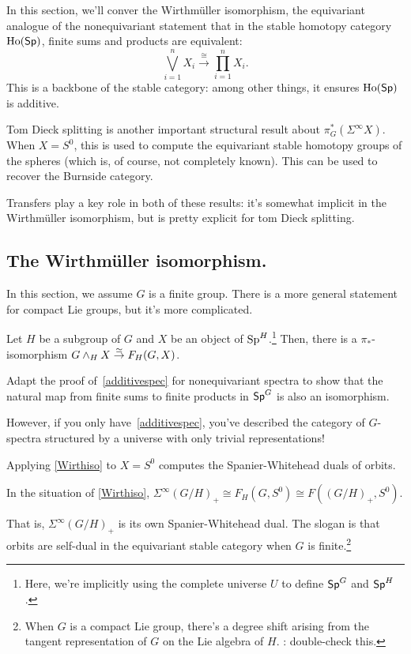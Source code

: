 In this section, we'll conver the Wirthmüller isomorphism, the equivariant analogue of the nonequivariant statement
that in the stable homotopy category $\operatorname{Ho}(\mathsf{Sp})$, finite sums and products are equivalent:
\begin{equation}
\label{additivespec}
\bigvee_{i=1}^n X_i\stackrel\cong\longrightarrow \prod_{i=1}^n X_i.
\end{equation}
This is a backbone of the stable category: among other things, it ensures $\operatorname{Ho}(\mathsf{Sp})$ is additive.

Tom Dieck splitting is another important structural result about $\pi_G^*(\Sigma^\infty X)$. When $X = S^0$, this
is used to compute the equivariant stable homotopy groups of the spheres (which is, of course, not completely
known). This can be used to recover the Burnside category.

Transfers play a key role in both of these results: it's somewhat implicit in the Wirthmüller isomorphism, but is
pretty explicit for tom Dieck splitting.
\subsection*{The Wirthmüller isomorphism.}
In this section, we assume $G$ is a finite group. There is a more general statement for compact Lie groups, but
it's more complicated.
\begin{thm}
\label{Wirthiso}
Let $H$ be a subgroup of $G$ and $X$ be an object of $\mathrm{Sp}^H$.\footnote{Here, we're implicitly using the complete
universe $U$ to define $\mathsf{Sp}^G$ and $\mathsf{Sp}^H$.} Then, there is a $\pi_*$-isomorphism $G\wedge_H X\stackrel\simeq\to F_H(G,X)$.
\end{thm}
\begin{ex}
Adapt the proof of~\eqref{additivespec} for nonequivariant spectra to show that the natural map from finite sums to
finite products in $\mathsf{Sp}^G$ is also an isomorphism.
\end{ex}
However, if you only have~\eqref{additivespec}, you've described the category of $G$-spectra structured by a
universe with only trivial representations!

Applying \cref{Wirthiso} to $X = S^0$ computes the Spanier-Whitehead duals of orbits.
\begin{cor}
\label{wirthcor}
In the situation of \cref{Wirthiso}, $\Sigma^\infty(G/H)_+\cong F_H(G,S^0)\cong F((G/H)_+, S^0)$.
\end{cor}
That is, $\Sigma^\infty (G/H)_+$ is its own Spanier-Whitehead dual. The slogan is that orbits are self-dual in the
equivariant stable category when $G$ is finite.\footnote{When $G$ is a compact Lie group, there's a degree shift
arising from the tangent representation of $G$ on the Lie algebra of $H$. \TODO: double-check this.}

